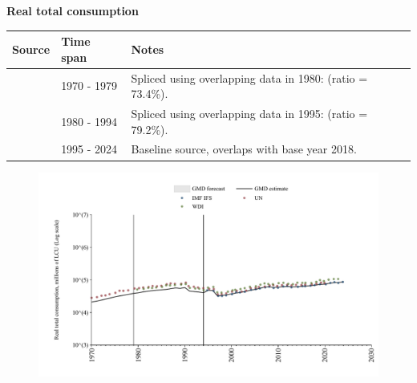 \documentclass[12pt,a4paper,landscape]{article}
\begin{document}
\begin{adjustbox}{max totalsize={\paperwidth}{\paperheight},center}
\begin{minipage}[t][\textheight][t]{\textwidth}
\vspace*{0.5cm}
{}
\begin{center}
{\Large\bfseries Real total consumption}
\end{center}
\vspace{0.5cm}
\begin{table}[H]
\centering
\small
\begin{tabular}{|l|l|l|}
\hline
\textbf{Source} & \textbf{Time span} & \textbf{Notes} \\
\hline
\rowcolor{white}\cite{UN}& 1970 - 1979 &Spliced using overlapping data in 1980: (ratio = 73.4\%). \\
\rowcolor{lightgray}\cite{WDI}& 1980 - 1994 &Spliced using overlapping data in 1995: (ratio = 79.2\%). \\
\rowcolor{white}\cite{IMF_IFS}& 1995 - 2024 &Baseline source, overlaps with base year 2018. \\
\hline
\end{tabular}
\end{table}
\begin{figure}[H]
\centering
\includegraphics[width=\textwidth,height=0.6\textheight,keepaspectratio]{graphs/BGR_rcons.pdf}
\end{figure}
\end{minipage}
\end{adjustbox}
\end{document}

